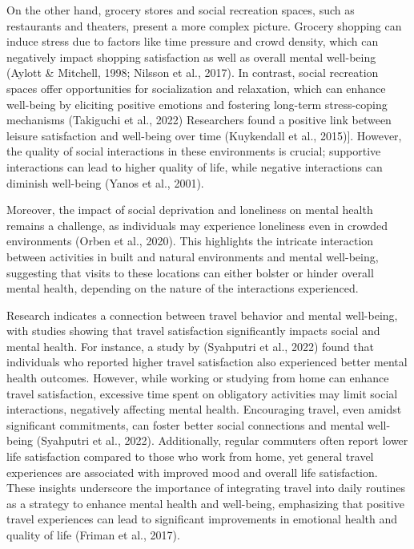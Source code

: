 \documentclass[
  letterpaper,
  number,
  review,
  3p]{elsarticle}
\begin{document}
On the other hand, grocery stores and social recreation spaces, such as
restaurants and theaters, present a more complex picture. Grocery
shopping can induce stress due to factors like time pressure and crowd
density, which can negatively impact shopping satisfaction as well as
overall mental well-being (Aylott \& Mitchell, 1998; Nilsson et al.,
2017). In contrast, social recreation spaces offer opportunities for
socialization and relaxation, which can enhance well-being by eliciting
positive emotions and fostering long-term stress-coping mechanisms
(Takiguchi et al., 2022) Researchers found a positive link between
leisure satisfaction and well-being over time (Kuykendall et al.,
2015){]}. However, the quality of social interactions in these
environments is crucial; supportive interactions can lead to higher
quality of life, while negative interactions can diminish well-being
(Yanos et al., 2001).

Moreover, the impact of social deprivation and loneliness on mental
health remains a challenge, as individuals may experience loneliness
even in crowded environments (Orben et al., 2020). This highlights the
intricate interaction between activities in built and natural
environments and mental well-being, suggesting that visits to these
locations can either bolster or hinder overall mental health, depending
on the nature of the interactions experienced.

Research indicates a connection between travel behavior and mental
well-being, with studies showing that travel satisfaction significantly
impacts social and mental health. For instance, a study by (Syahputri et
al., 2022) found that individuals who reported higher travel
satisfaction also experienced better mental health outcomes. However,
while working or studying from home can enhance travel satisfaction,
excessive time spent on obligatory activities may limit social
interactions, negatively affecting mental health. Encouraging travel,
even amidst significant commitments, can foster better social
connections and mental well-being (Syahputri et al., 2022).
Additionally, regular commuters often report lower life satisfaction
compared to those who work from home, yet general travel experiences are
associated with improved mood and overall life satisfaction. These
insights underscore the importance of integrating travel into daily
routines as a strategy to enhance mental health and well-being,
emphasizing that positive travel experiences can lead to significant
improvements in emotional health and quality of life (Friman et al.,
2017).
\end{document}
